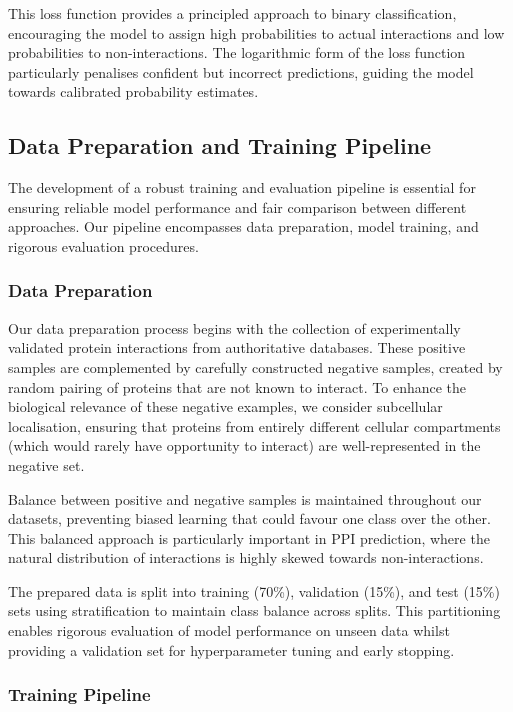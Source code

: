 \documentclass[12pt,a4paper]{article}
\begin{document}
This loss function provides a principled approach to binary classification, encouraging the model to assign high probabilities to actual interactions and low probabilities to non-interactions. The logarithmic form of the loss function particularly penalises confident but incorrect predictions, guiding the model towards calibrated probability estimates.

\subsection{Data Preparation and Training Pipeline}
\label{sec:pipeline}

The development of a robust training and evaluation pipeline is essential for ensuring reliable model performance and fair comparison between different approaches. Our pipeline encompasses data preparation, model training, and rigorous evaluation procedures.

\subsubsection{Data Preparation}

Our data preparation process begins with the collection of experimentally validated protein interactions from authoritative databases. These positive samples are complemented by carefully constructed negative samples, created by random pairing of proteins that are not known to interact. To enhance the biological relevance of these negative examples, we consider subcellular localisation, ensuring that proteins from entirely different cellular compartments (which would rarely have opportunity to interact) are well-represented in the negative set.

Balance between positive and negative samples is maintained throughout our datasets, preventing biased learning that could favour one class over the other. This balanced approach is particularly important in PPI prediction, where the natural distribution of interactions is highly skewed towards non-interactions.

The prepared data is split into training (70\%), validation (15\%), and test (15\%) sets using stratification to maintain class balance across splits. This partitioning enables rigorous evaluation of model performance on unseen data whilst providing a validation set for hyperparameter tuning and early stopping.

\subsubsection{Training Pipeline}
\end{document}

